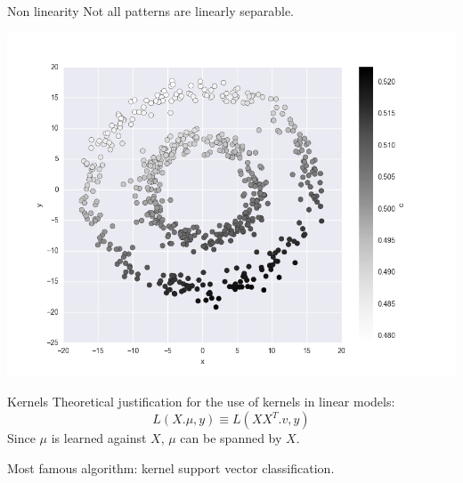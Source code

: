 \documentclass[11pt]{beamer}
\begin{document}
\begin{frame}{Non linearity}
Not all patterns are linearly separable.
\begin{center}
\includegraphics[scale=0.30]{circle_linear_model.png} 
\end{center}
\end{frame}

\begin{frame}{Kernels}
Theoretical justification for the use of kernels in linear models:
$$ L(X.\mu, y) \equiv L(XX^T.v, y) $$
Since $\mu$ is learned against $X$, $\mu$ can be spanned by $X$.

Most famous algorithm: kernel support vector classification.
\end{frame}
\end{document}
